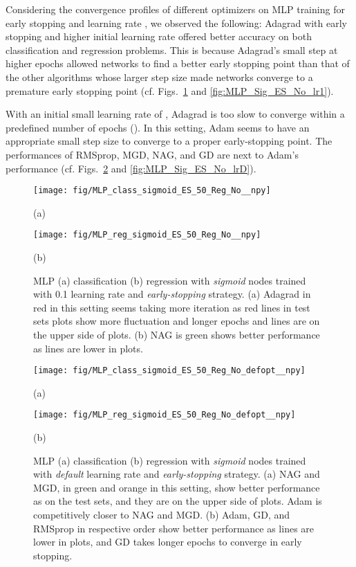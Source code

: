 \documentclass[11pt,a4paper]{article}
\begin{document}
    Considering the convergence profiles of different optimizers on MLP training for early stopping and learning rate , we observed the following: Adagrad with early stopping and higher initial learning rate offered better accuracy on both classification and regression problems. This is because Adagrad's small step at higher epochs allowed networks to find a better early stopping point than that of the other algorithms whose larger step size made networks converge to a premature early stopping point (cf. Figs.~\ref{fig:MLP_Sig_ES_50_lr1} and \ref{fig:MLP_Sig_ES_No_lr1}).
    
    With an initial small learning rate of , Adagrad is too slow to converge within a predefined number of epochs (). In this setting, Adam seems to have an  appropriate small step size to converge to a proper early-stopping point. The performances of RMSprop, MGD, NAG, and GD are next to Adam's performance (cf. Figs.~\ref{fig:MLP_Sig_ES_50_lrD} and \ref{fig:MLP_Sig_ES_No_lrD}).
    
    
\begin{figure}
        \centering
        \texttt{[image: fig/MLP\_class\_sigmoid\_ES\_50\_Reg\_No\_\_npy]}


        (a)
        
        \centering
        \texttt{[image: fig/MLP\_reg\_sigmoid\_ES\_50\_Reg\_No\_\_npy]}
        
        (b)
        \caption{MLP (a) classification (b) regression with \textit{sigmoid} nodes trained with 0.1 learning rate and \textit{early-stopping} strategy. (a) Adagrad in red in this setting seems taking more iteration as red lines in test sets plots show more fluctuation and longer epochs and lines are on the upper side of plots. (b) NAG is green shows better performance as lines are lower in plots.
        \label{fig:MLP_Sig_ES_50_lr1}}
    \end{figure}
    
\begin{figure}
        \centering
        \texttt{[image: fig/MLP\_class\_sigmoid\_ES\_50\_Reg\_No\_defopt\_\_npy]}


        (a)
        
        \centering
        \texttt{[image: fig/MLP\_reg\_sigmoid\_ES\_50\_Reg\_No\_defopt\_\_npy]}
        
        (b)
        \caption{MLP (a) classification (b) regression with \textit{sigmoid} nodes trained with \textit{default} learning rate  and \textit{early-stopping} strategy. (a) NAG and MGD, in green and orange in this setting, show better performance as on the test sets, and they are on the upper side of plots. Adam is competitively closer to NAG and MGD. (b) Adam, GD, and RMSprop in respective order show better performance as lines are lower in plots, and GD takes longer epochs to converge in early stopping.
        \label{fig:MLP_Sig_ES_50_lrD}}
    \end{figure}
    
\end{document}
